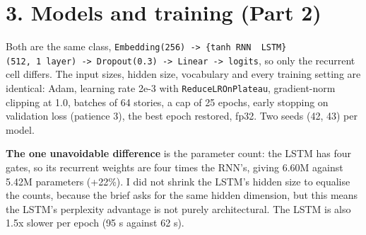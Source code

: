 \documentclass[10pt,a4paper]{article}
\begin{document}
\hypertarget{models-and-training-part-2}{%
\section{3. Models and training (Part 2)}\label{models-and-training-part-2}}

Both are the same class, \texttt{Embedding(256)\ -\textgreater{}\ \{tanh\ RNN\ \textbar{}\ LSTM\}(512,\ 1\ layer)\ -\textgreater{}\ Dropout(0.3)\ -\textgreater{}\ Linear\ -\textgreater{}\ logits},
so only the recurrent cell differs. The input sizes, hidden size, vocabulary and every training setting are identical:
Adam, learning rate 2e-3 with \texttt{ReduceLROnPlateau}, gradient-norm clipping at 1.0, batches of 64 stories, a cap of 25
epochs, early stopping on validation loss (patience 3), the best epoch restored, fp32. Two seeds (42, 43) per model.

\textbf{The one unavoidable difference} is the parameter count: the LSTM has four gates, so its recurrent weights are four
times the RNN's, giving 6.60M against 5.42M parameters (+22\%). I did not shrink the LSTM's hidden size to equalise
the counts, because the brief asks for the same hidden dimension, but this means the LSTM's perplexity advantage is not
purely architectural. The LSTM is also 1.5x slower per epoch (95 s against 62 s).
\end{document}
